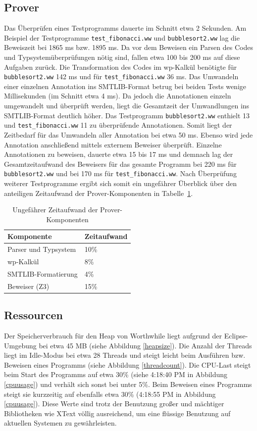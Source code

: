 \subsection{Prover}
Das Überprüfen eines Testprogramms dauerte im Schnitt etwa 2 Sekunden. Am Beispiel der Testprogramme \texttt{test\_fibonacci.ww} und \texttt{bubblesort2.ww} lag die Beweiszeit bei 1865 ms bzw. 1895 ms. Da vor dem Beweisen ein Parsen des Codes und Typsystemüberprüfungen nötig sind, fallen etwa 100 bis 200 ms auf diese Aufgaben zurück. Die Transformation des Codes im wp-Kalkül benötigte für \texttt{bubblesort2.ww} 142 ms und für \texttt{test\_fibonacci.ww} 36 ms. Das Umwandeln einer einzelnen Annotation ins SMTLIB-Format betrug bei beiden Tests wenige Millisekunden (im Schnitt etwa 4 ms). Da jedoch die Annotationen einzeln umgewandelt und überprüft werden, liegt die Gesamtzeit der Umwandlungen ins SMTLIB-Format deutlich höher. Das Testprogramm \texttt{bubblesort2.ww} enthielt 13 und \texttt{test\_fibonacci.ww} 11 zu überprüfende Annotationen. Somit liegt der Zeitbedarf für das Umwandeln aller Annotation bei etwa 50 ms. Ebenso wird jede Annotation anschließend mittels externem Beweiser überprüft. Einzelne Annotationen zu beweisen, dauerte etwa 15 bis 17 ms und demnach lag der Gesamtzeitaufwand des Beweisers für das gesamte Programm bei 220 ms für \texttt{bubblesort2.ww} und bei 170 ms für \texttt{test\_fibonacci.ww}. Nach Überprüfung weiterer Testprogramme ergibt sich somit ein ungefährer Überblick über den anteiligen Zeitaufwand der Prover-Komponenten in Tabelle~\ref{zeitaufwandprover}.

\begin{table}
\centering
\caption{Ungefährer Zeitaufwand der Prover-Komponenten}
\label{zeitaufwandprover}
\begin{tabular}{|l|l|}
\hline
\textbf{Komponente} & \textbf{Zeitaufwand} \\
\hline
Parser und Typsystem & 10\% \\
\hline
wp-Kalkül & 8\% \\
\hline
SMTLIB-Formatierung & 4\% \\
\hline
Beweiser (Z3) & 15\% \\
\hline
\end{tabular}
\end{table}

\subsection{Ressourcen}
Der Speicherverbrauch für den Heap von Worthwhile liegt aufgrund der Eclipse-Umgebung bei etwa 45 MB (siehe Abbildung \ref{heapsize}). Die Anzahl der Threads liegt im Idle-Modus bei etwa 28 Threads und steigt leicht beim Ausführen bzw. Beweisen eines Programms (siehe Abbildung \ref{threadcount}). Die CPU-Last steigt beim Start des Programms auf etwa 30\% (siehe 4:18:40 PM in Abbildung \ref{cpuusage}) und verhält sich sonst bei unter 5\%. Beim Beweisen eines Programms steigt sie kurzzeitig auf ebenfalls etwa 30\% (4:18:55 PM in Abbildung \ref{cpuusage}). Diese Werte sind trotz der Benutzung großer und mächtiger Bibliotheken wie XText völlig ausreichend, um eine flüssige Benutzung auf aktuellen Systemen zu gewährleisten.

